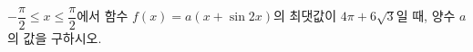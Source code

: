 $-\dfrac{\pi}{2}\le x\le\dfrac{\pi}{2}$에서 함수 $f(x)=a(x+\sin 2x)$의 최댓값이 $4\pi+6\sqrt{3}$일 때, 양수 $a$의 값을 구하시오.
